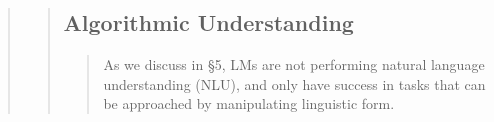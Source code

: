 \begin{quote}
\begin{quote}
%
%
%
\subsection{Algorithmic Understanding}

\begin{quote}
As we discuss in §5, LMs are not performing natural language understanding (NLU), and only have success in tasks that can be approached by manipulating linguistic form. \cite[610]{bender2021b}
\begin{quote}


\end{quote}
\end{quote}
\end{quote}
\end{quote}
